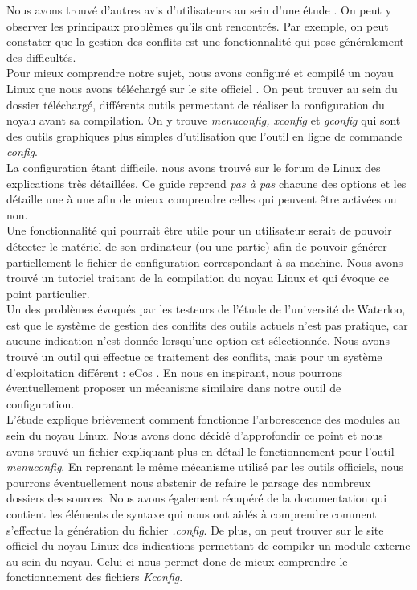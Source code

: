 \documentclass[17pts]{report}
\begin{document}
Nous avons trouvé d'autres avis d'utilisateurs au sein d'une étude
\cite{Hubaux:2012:USC:2110147.2110164}. On peut y observer les principaux
problèmes qu'ils ont rencontrés. Par exemple, on peut constater que la gestion
des conflits est une fonctionnalité qui pose généralement des difficultés.  \\

Pour mieux comprendre notre sujet, nous avons configuré et compilé un noyau
Linux que nous avons téléchargé sur le site officiel \cite{Kernel}. On peut
trouver au sein du dossier téléchargé, différents outils permettant de réaliser
la configuration du noyau avant sa compilation. On y trouve \textit{menuconfig,
xconfig} et \textit{gconfig} qui sont des outils graphiques plus simples
d'utilisation que l'outil en ligne de commande \textit{config}.  \\

La configuration étant difficile, nous avons trouvé sur le forum de Linux
\cite{Existant:Kernel:ForumTutoConfig} des explications très détaillées. Ce
guide reprend \textit{pas à pas} chacune des options et les détaille une à une
afin de mieux comprendre celles qui peuvent être activées ou non.  \\

Une fonctionnalité qui pourrait être utile pour un utilisateur serait de
pouvoir détecter le matériel de son ordinateur (ou une partie) afin de pouvoir
générer partiellement le fichier de configuration correspondant à sa machine.
Nous avons trouvé un tutoriel \cite{Existant:Kernel:outils} traitant de la
compilation du noyau Linux et qui évoque ce point particulier.  \\

Un des problèmes évoqués par les testeurs de l'étude \cite{Waterloo:Etude} de
l'université de Waterloo, est que le système de gestion des conflits des outils
actuels n'est pas pratique, car aucune indication n'est donnée lorsqu'une
option est sélectionnée. Nous avons trouvé un outil qui effectue ce traitement
des conflits, mais pour un système d'exploitation différent : eCos
\cite{Existant:EcosConfig}. En nous en inspirant, nous pourrons éventuellement
proposer un mécanisme similaire dans notre outil de configuration.  \\

L'étude \cite{Waterloo:Etude} explique brièvement comment fonctionne
l'arborescence des modules au sein du noyau Linux. Nous avons donc décidé
d'approfondir ce point et nous avons trouvé un fichier
\cite{Existant:Kconfig:frontends} expliquant plus en détail le fonctionnement
pour l'outil \textit{menuconfig}. En reprenant le même mécanisme utilisé par
les outils officiels, nous pourrons éventuellement nous abstenir de refaire le
parsage des nombreux dossiers des sources. Nous avons également récupéré de la
documentation \cite{Existant:Kconfig:vueDensemble}
\cite{Existant:Kconfig:langage} qui contient les éléments de syntaxe qui nous
ont aidés à comprendre comment s'effectue la génération du fichier
\textit{.config}.  De plus, on peut trouver sur le site officiel du noyau Linux
des indications \cite{Existant:Kconfig:modules} permettant de compiler un
module externe au sein du noyau. Celui-ci nous permet donc de mieux comprendre
le fonctionnement des fichiers \textit{Kconfig}.
\end{document}
